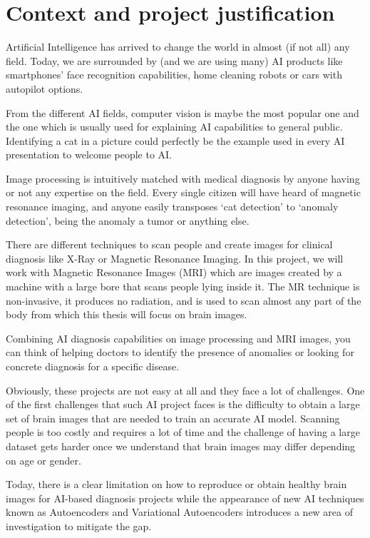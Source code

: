 \section{Context and project justification}

Artificial Intelligence has arrived to change the world in almost (if not all) any field. Today, we are surrounded by (and we are using many) AI products like smartphones’ face recognition capabilities, home cleaning robots or cars with autopilot options.

From the different AI fields, computer vision is maybe the most popular one and the one which is usually used for explaining AI capabilities to general public. Identifying a cat in a picture could perfectly be the example used in every AI presentation to welcome people to AI.

Image processing is intuitively matched with medical diagnosis by anyone having or not any expertise on the field. Every single citizen will have heard of magnetic resonance imaging, and anyone easily transposes ‘cat detection’ to ‘anomaly detection’, being the anomaly a tumor or anything else.

There are different techniques to scan people and create images for clinical diagnosis like X-Ray or Magnetic Resonance Imaging. In this project, we will work with Magnetic Resonance Images (MRI) which are images created by a machine with a large bore that scans people lying inside it. The MR technique is non-invasive, it produces no radiation, and is used to scan almost any part of the body from which this thesis will focus on brain images.

Combining AI diagnosis capabilities on image processing and MRI images, you can think of helping doctors to identify the presence of anomalies or looking for concrete diagnosis for a specific disease.

Obviously, these projects are not easy at all and they face a lot of challenges. One of the first challenges that such AI project faces is the difficulty to obtain a large set of brain images that are needed to train an accurate AI model. Scanning people is too costly and requires a lot of time and the challenge of having a large dataset gets harder once we understand that brain images may differ depending on age or gender.

Today, there is a clear limitation on how to reproduce or obtain healthy brain images for AI-based diagnosis projects while the appearance of new AI techniques known as Autoencoders and Variational Autoencoders introduces a new area of investigation to mitigate the gap.

